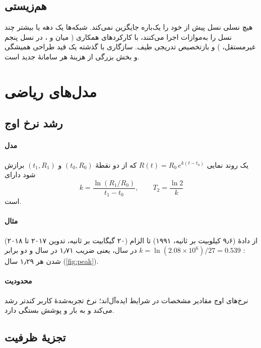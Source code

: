 \documentclass[11pt,a4paper]{article}
\begin{document}
\subsection{هم‌زیستی}
هیچ نسلی نسل پیش از خود را یک‌باره جایگزین نمی‌کند. شبکه‌ها یک دهه یا بیشتر چند نسل را به‌موازات اجرا می‌کنند، با کارکردهای همکاری ( میان
 و ،  در نسل پنجم غیرمستقل، ) و بازتخصیص تدریجی طیف. سازگاری با گذشته یک قید طراحی همیشگی و بخش
بزرگی از هزینهٔ هر سامانهٔ جدید است.

\section{مدل‌های ریاضی}

\subsection{رشد نرخ اوج}\label{sec:peak}
\paragraph{مدل} یک روند نمایی $R(t) = R_0\, e^{k (t - t_0)}$ که از دو نقطهٔ $(t_0, R_0)$ و $(t_1, R_1)$ برازش شود دارای
\begin{equation}\label{eq:growth}
  k = \frac{\ln (R_1/R_0)}{t_1 - t_0}, \qquad T_2 = \frac{\ln 2}{k}
\end{equation}
است.
\paragraph{مثال} از دادهٔ  (۹٫۶ کیلوبیت بر ثانیه، ۱۹۹۱) تا الزام  (۲۰ گیگابیت بر ثانیه، تدوین ۲۰۱۷ تا ۲۰۱۸) \cite{itu2017m2410}:
$k = \ln(2.08\times10^{6})/27 = 0.539$ در سال، یعنی ضریب ۱٫۷۱ در سال و دو برابر شدن هر ۱٫۲۹ سال (\cref{fig:peak}).
\paragraph{محدودیت} نرخ‌های اوج مقادیر مشخصات در شرایط ایده‌آل‌اند؛ نرخ تجربه‌شدهٔ کاربر کندتر رشد می‌کند و به بار و پوشش بستگی دارد.

\begin{acnfigure}
  \caption{نرخ‌های اوج فروسوی تعیین‌شدهٔ فناوری‌های  و برازش نمایی \cref{eq:growth}.}
  \label{fig:peak}
\end{acnfigure}

\subsection{تجزیهٔ ظرفیت}\label{sec:cap}
\end{document}
